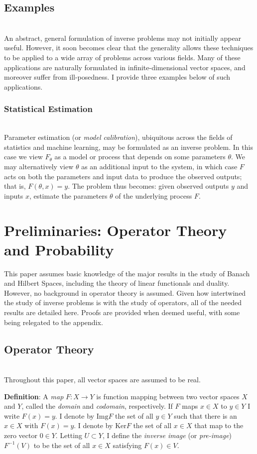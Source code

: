 \documentclass[12pt]{amsart}
\newcommand{\Img}{\mathrm{Img}}
\newcommand{\Ker}{\mathrm{Ker}}
\begin{document}
 \subsection{Examples} \hfill \\
 An abstract, general formulation of inverse problems may not initially appear useful. However, it soon becomes clear that the generality allows these techniques to be applied to a wide array of problems across various fields. Many of these applications are naturally formulated in infinite-dimensional vector spaces, and moreover suffer from ill-posedness. I provide three examples below of such applications. 
 
 \subsubsection{Statistical Estimation} \hfill \\
 Parameter estimation (or \textit{model calibration}), ubiquitous across the fields of statistics and machine learning, may be formulated as an inverse problem. In this case we view $F_\theta$ as a model or process that depends on some parameters $\theta$. We may alternatively view $\theta$ as an additional input to the system, in which case $F$ acts on both the parameters and input data to produce the observed outputs; that is, $F(\theta, x) = y$. The problem thus becomes: given observed outputs $y$ and inputs $x$, estimate the parameters $\theta$ of the underlying process $F$. 
 
 \section{Preliminaries: Operator Theory and Probability}
 This paper assumes basic knowledge of the major results in the study of Banach and Hilbert Spaces, including the theory of linear functionals and duality. However, no background in operator theory is assumed. Given how intertwined the study of inverse problems is with the study of operators, all of the needed results are detailed here. Proofs are provided when deemed useful, with some being relegated to the appendix. 
 
 \subsection{Operator Theory} \hfill \\
 Throughout this paper, all vector spaces are assumed to be real. 
 
 \textbf{Definition}: A \textit{map} $F: X \to Y$ is function mapping between two vector spaces $X$ and $Y$, called the \textit{domain} and \textit{codomain}, respectively. If $F$ maps $x \in X$ to $y \in Y$ I write $F(x) = y$. I denote by $\Img F$ the set of all $y \in Y$ such that there is an $x \in X$ with $F(x) = y$. I denote by $\Ker F$ the set of all $x \in X$ that map to the zero vector $0 \in Y$. Letting $U \subset Y$, I define the \textit{inverse image} (or \textit{pre-image}) $F^{-1}(V)$ to be the set of all $x \in X$ satisfying $F(x) \in V$. 
 
\end{document}
